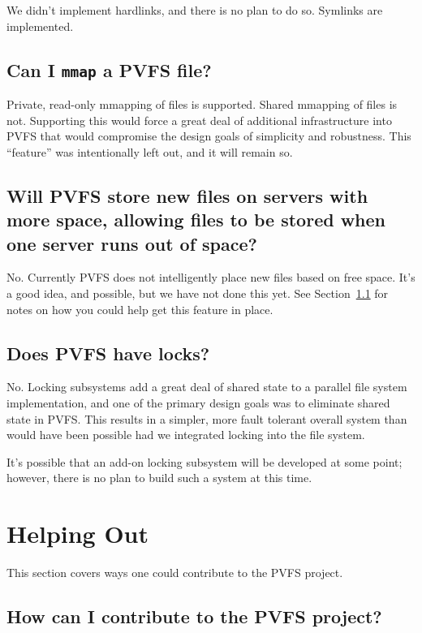 \documentclass[11pt,letterpaper]{article}
\begin{document}
We didn't implement hardlinks, and there is no plan to do so.  Symlinks are
implemented.

\subsection{Can I \texttt{mmap} a PVFS file?}

Private, read-only mmapping of files is supported.  Shared mmapping of files
is not.  Supporting this would force a great deal of additional infrastructure
into PVFS that would compromise the design goals of simplicity and
robustness.  This ``feature'' was intentionally left out, and it will remain
so.

\subsection{Will PVFS store new files on servers with more space, allowing
            files to be stored when one server runs out of space?}

No.  Currently PVFS does not intelligently place new files based on free
space.  It's a good idea, and possible, but we have not done this yet.  See
Section~\ref{sec:contributing} for notes on how you could help get this
feature in place.

\subsection{Does PVFS have locks?}

No.  Locking subsystems add a great deal of shared state to a parallel file 
system implementation, and one of the primary design goals was to eliminate
shared state in PVFS.  This results in a simpler, more fault tolerant
overall system than would have been possible had we integrated locking into
the file system.

It's possible that an add-on locking subsystem will be developed at some point;
however, there is no plan to build such a system at this time.

%
%
\section{Helping Out}

This section covers ways one could contribute to the PVFS project.

\subsection{How can I contribute to the PVFS project?}
\label{sec:contributing}
\end{document}
